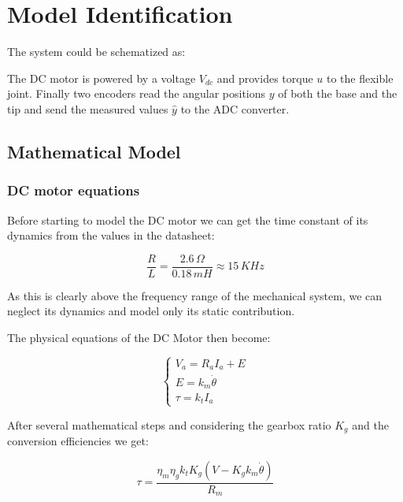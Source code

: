 \chapter{Model Identification}
\label{cha:model_identification}

    The system could be schematized as:


    The DC motor is powered by a voltage $V_{dc}$ and provides torque $u$ to the flexible joint. Finally two encoders read the angular positions $y$ of both the base and the tip and send the measured values $\hat{y}$ to the ADC converter.

    \section{Mathematical Model}

        \subsection{DC motor equations}

            Before starting to model the DC motor we can get the time constant of its dynamics from the values in the datasheet:

            \[
                \frac{R}{L} = \frac{2.6 \, \Omega}{0.18 \, mH} \approx  15 \, KHz
            \]
                
            As this is clearly above the frequency range of the mechanical system, we can neglect its dynamics and model only its static contribution.
            
            The physical equations of the DC Motor then become:
            
            \begin{equation*}
                \begin{cases}
                    V_a = R_a I_a + E \\
                    E = k_m \dot\theta \\
                    \tau = k_t I_a
                \end{cases}
            \end{equation*}

            After several mathematical steps and considering the gearbox ratio $K_g$ and the conversion efficiencies we get:

            \[
                \tau = \frac{\eta_m\eta_g k_t K_g(V - K_g k_m\dot\theta)}{R_m} 
            \]
            

